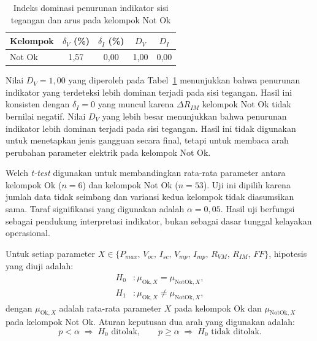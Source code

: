 \begin{table}[H]
\caption{Indeks dominasi penurunan indikator sisi tegangan dan arus pada
         kelompok Not Ok}
\label{tab:dominasi_penurunan}
\centering
\begin{tabular}{lcccc}
\toprule
\textbf{Kelompok} & \textbf{$\delta_V$ (\%)} & \textbf{$\delta_I$ (\%)} &
\textbf{$D_V$} & \textbf{$D_I$} \\
\midrule
Not Ok & 1,57 & 0,00 & 1,00 & 0,00 \\
\bottomrule
\end{tabular}
\end{table}

Nilai $D_V = 1{,}00$ yang diperoleh pada Tabel~\ref{tab:dominasi_penurunan}
menunjukkan bahwa penurunan indikator yang terdeteksi lebih dominan terjadi
pada sisi tegangan. Hasil ini konsisten dengan $\delta_I = 0$ yang muncul
karena $\Delta R_{IM}$ kelompok Not Ok tidak bernilai negatif. Nilai $D_V$ yang
lebih besar menunjukkan bahwa penurunan indikator lebih dominan terjadi pada
sisi tegangan. Hasil ini tidak digunakan untuk menetapkan jenis gangguan secara
final, tetapi untuk membaca arah perubahan parameter elektrik pada kelompok Not
Ok.

Welch \textit{t-test} digunakan untuk membandingkan rata-rata parameter antara
kelompok Ok ($n=6$) dan kelompok Not Ok ($n=53$). Uji ini dipilih karena jumlah
data tidak seimbang dan variansi kedua kelompok tidak diasumsikan sama. Taraf
signifikansi yang digunakan adalah $\alpha=0{,}05$. Hasil uji berfungsi sebagai
pendukung interpretasi indikator, bukan sebagai dasar tunggal kelayakan
operasional.

Untuk setiap parameter $X \in \{P_{max},\,V_{oc},\,I_{sc},\,V_{mp},\,I_{mp},\,
R_{VM},\,R_{IM},\,FF\}$, hipotesis yang diuji adalah:
\begin{equation}
\begin{aligned}
H_0 &: \mu_{\mathrm{Ok},X} = \mu_{\mathrm{NotOk},X},\\
H_1 &: \mu_{\mathrm{Ok},X} \neq \mu_{\mathrm{NotOk},X},
\end{aligned}
\label{eq:hipotesis_welch}
\end{equation}
dengan $\mu_{\mathrm{Ok},X}$ adalah rata-rata parameter $X$ pada kelompok Ok
dan $\mu_{\mathrm{NotOk},X}$ pada kelompok Not Ok. Aturan keputusan dua arah
yang digunakan adalah:
\begin{equation}
p < \alpha \;\Rightarrow\; H_0 \text{ ditolak},\qquad
p \geq \alpha \;\Rightarrow\; H_0 \text{ tidak ditolak}.
\label{eq:keputusan_welch}
\end{equation}

